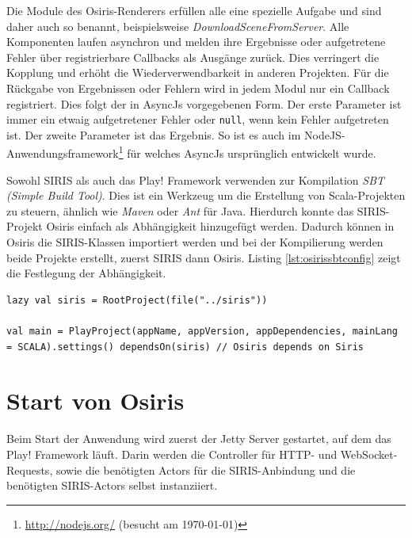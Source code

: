 Die Module des Osiris-Renderers erfüllen alle eine spezielle Aufgabe und sind daher auch so benannt, beispielsweise \textit{DownloadSceneFromServer}. Alle Komponenten laufen asynchron und melden ihre Ergebnisse oder aufgetretene Fehler über registrierbare Callbacks als Ausgänge zurück. Dies verringert die Kopplung und erhöht die Wiederverwendbarkeit in anderen Projekten. Für die Rückgabe von Ergebnissen oder Fehlern wird in jedem Modul nur ein Callback registriert. Dies folgt der in AsyncJs vorgegebenen Form. Der erste Parameter ist immer ein etwaig aufgetretener Fehler oder \texttt{null}, wenn kein Fehler aufgetreten ist. Der zweite Parameter ist das Ergebnis. So ist es auch im NodeJS-Anwendungsframework\footnote{\url{http://nodejs.org/} (besucht am \today)} für welches AsyncJs ursprünglich entwickelt wurde.

Sowohl SIRIS als auch das Play! Framework verwenden zur Kompilation \textit{SBT (Simple Build Tool)}. Dies ist ein Werkzeug um die Erstellung von Scala-Projekten zu steuern, ähnlich wie \textit{Maven} oder \textit{Ant} für Java. Hierdurch konnte das SIRIS-Projekt Osiris einfach als Abhängigkeit hinzugefügt werden. Dadurch können in Osiris die SIRIS-Klassen importiert werden und bei der Kompilierung werden beide Projekte erstellt, zuerst SIRIS dann Osiris. Listing \ref{lst:osirissbtconfig} zeigt die Festlegung der Abhängigkeit.
\lstset{language=Scala}
\begin{lstlisting}[caption={Beschreibung der Abhängigkeit Osiris' von SIRIS in SBT}, label={lst:osirissbtconfig}]
lazy val siris = RootProject(file("../siris"))

val main = PlayProject(appName, appVersion, appDependencies, mainLang = SCALA).settings() dependsOn(siris) // Osiris depends on Siris
\end{lstlisting}

\section{Start von Osiris}
Beim Start der Anwendung wird zuerst der Jetty Server gestartet, auf dem das Play! Framework läuft. Darin werden die Controller für HTTP- und WebSocket-Requests, sowie die benötigten Actors für die SIRIS-Anbindung und die benötigten SIRIS-Actors selbst instanziiert.

